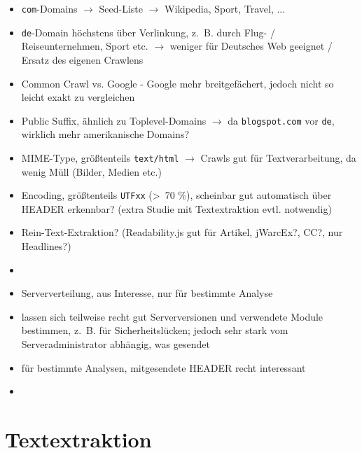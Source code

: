 \documentclass[a4paper,12pt,titlepage=false]{scrreprt}
\begin{document}
\begin{itemize}
    \item \texttt{com}-Domains $\rightarrow$ Seed-Liste $\rightarrow$ Wikipedia, Sport, Travel, ...
    \item \texttt{de}-Domain höchstens über Verlinkung, z.\ B. durch Flug- / Reiseunternehmen, Sport etc. $\rightarrow$ weniger für Deutsches Web geeignet / Ersatz des eigenen Crawlens
    \item Common Crawl vs. Google - Google mehr breitgefächert, jedoch nicht so leicht exakt zu vergleichen
    \item Public Suffix, ähnlich zu Toplevel-Domains $\rightarrow$ da \texttt{blogspot.com} vor \texttt{de}, wirklich mehr amerikanische Domains?
\end{itemize}
\vspace{.1cm}
\begin{itemize}
    \item MIME-Type, größtenteils \texttt{text/html} $\rightarrow$ Crawls gut für Textverarbeitung, da wenig Müll (Bilder, Medien etc.)
    \item Encoding, größtenteils \texttt{UTFxx} (\textgreater\ 70 \%), scheinbar gut automatisch über HEADER erkennbar? (extra Studie mit Textextraktion evtl. notwendig)
    \item Rein-Text-Extraktion? (Readability.js gut für Artikel, jWarcEx?, CC?, nur Headlines?)
    \item 
\end{itemize}
\vspace{.1cm}
\begin{itemize}
    \item Serververteilung, aus Interesse, nur für bestimmte Analyse
    \item lassen sich teilweise recht gut Serverversionen und verwendete Module bestimmen, z.\ B. für Sicherheitslücken; jedoch sehr stark vom Serveradministrator abhängig, was gesendet
    \item für bestimmte Analysen, mitgesendete HEADER recht interessant
    \item 
\end{itemize}


\chapter{Textextraktion}
\end{document}

